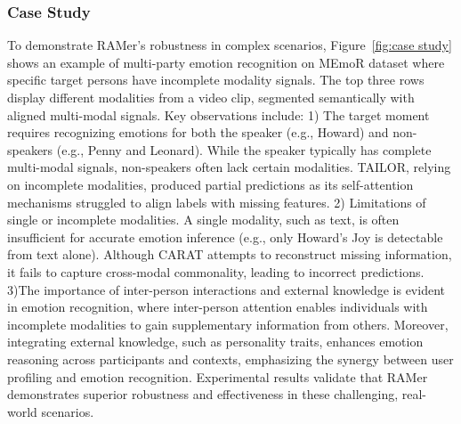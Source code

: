 \subsubsection{Case Study}
% 
To demonstrate RAMer’s robustness in complex scenarios, Figure~\ref{fig:case study} shows an example of multi-party emotion recognition on MEmoR dataset where specific target persons have incomplete modality signals. The top three rows display different modalities from a video clip, segmented semantically with aligned multi-modal signals. Key observations include: 1) The target moment requires recognizing emotions for both the speaker (e.g., Howard) and non-speakers (e.g., Penny and Leonard). While the speaker typically has complete multi-modal signals, non-speakers often lack certain modalities. TAILOR, relying on incomplete modalities, produced partial predictions as its self-attention mechanisms struggled to align labels with missing features. 2) Limitations of single or incomplete modalities. A single modality, such as text, is often insufficient for accurate emotion inference (e.g., only Howard’s Joy is detectable from text alone). Although CARAT attempts to reconstruct missing information, it fails to capture cross-modal commonality, leading to incorrect predictions. 3)The importance of inter-person interactions and external knowledge is evident in emotion recognition, where inter-person attention enables individuals with incomplete modalities to gain supplementary information from others. Moreover, integrating external knowledge, such as personality traits, enhances emotion reasoning across participants and contexts, emphasizing the synergy between user profiling and emotion recognition. Experimental results validate that RAMer demonstrates superior robustness and effectiveness in these challenging, real-world scenarios.
